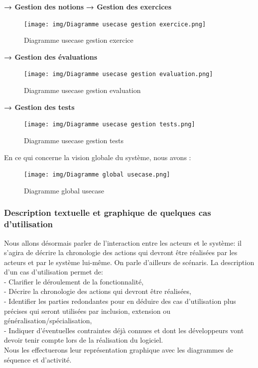 \textbf{→ Gestion des notions} 
%	
\textbf{→ Gestion des exercices}
	\begin{figure}[H]
	\centering
	\texttt{[image: img/Diagramme usecase gestion exercice.png]}
	\caption{Diagramme usecase gestion exercice}
	\end{figure}

\textbf{→ Gestion des évaluations} 	
	\begin{figure}[H]
	\centering
	\texttt{[image: img/Diagramme usecase gestion evaluation.png]}
	\caption{Diagramme usecase gestion evaluation}
	\end{figure}
	
\textbf{→ Gestion des tests}
	\begin{figure}[H]
	\caption{Diagramme usecase gestion tests}
	\centering
	\texttt{[image: img/Diagramme usecase gestion tests.png]}
	\end{figure}
	
En ce qui concerne la vision globale du système, nous avons : \\

\begin{figure}[H]
\centering
\texttt{[image: img/Diagramme global usecase.png]}
\caption{Diagramme global usecase}
\end{figure}


\subsubsection{Description textuelle et graphique de quelques cas d’utilisation}
	Nous allons désormais parler de l’interaction entre les acteurs et le système: il s’agira de décrire la chronologie des actions qui devront être réalisées par les acteurs et par le système lui-même. On parle d’ailleurs de scénaris. La description d’un cas d’utilisation permet de: \\
	- Clarifier le déroulement de la fonctionnalité, \\
	- Décrire la chronologie des actions qui devront être réalisées, \\
	- Identifier les parties redondantes pour en déduire des cas d’utilisation plus précises qui seront utilisées par inclusion, extension ou généralisation/spécialisation, \\
	- Indiquer d’éventuelles contraintes déjà connues et dont les développeurs vont devoir tenir compte lors de la réalisation du logiciel. \\
	Nous les effectuerons leur représentation graphique avec les diagrammes de séquence et d’activité. 
	
